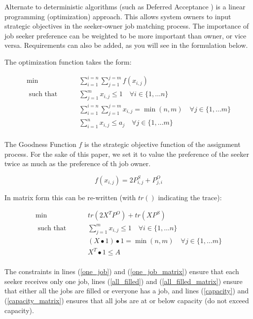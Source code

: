 Alternate to deterministic algorithms (such as Deferred Acceptance \cite{1962_Gale}) is a linear programming (optimization) approach. This allows system owners to input strategic objectives in the seeker-owner job matching process. The importance of job seeker preference can be weighted to be more important than owner, or vice versa. Requirements can also be added, as you will see in the formulation below.

The optimization function takes the form:

\begin{align}
\min \qquad & \sum_{i = 1}^{i=n} \sum_{j = 1}^{j=m} f(x_{i,j}) \\
\text{ such that } \qquad & \sum_{j=1}^m x_{i,j} \leq 1 \quad  \forall i \in \{1, \dots n\} \label{one_job}\\
& \sum_{i = 1}^{i=n} \sum_{j = 1}^{j=m}x_{i,j} = \min(n,m) \quad  \forall j \in \{1, \dots m\}  \label{all_filled}\\
& \sum_{i=1}^n x_{i,j} \leq a_j \quad  \forall j \in \{1, \dots m\} \label{capacity} \\
\end{align}

The Goodness Function $f$ is the strategic objective function of the assignment process. For the sake of this paper, we set it to value the preference of the seeker twice as much as the preference of th job owner.

\[f(x_{i,j}) = 2P^S_{i,j} + P^O_{j,i}\]

In matrix form this can be re-written (with $tr()$ indicating the trace):

\begin{align}
\min \qquad & tr(2X^TP^O) + tr(XP^S) \\
\text{ such that } \qquad & \sum_{j=1}^m x_{i,j} \leq 1 \quad  \forall i \in \{1, \dots n\}  \label{one_job_matrix}\\
& (X \bullet 1)\bullet 1 = \min(n,m) \quad  \forall j \in \{1, \dots m\} \label{all_filled_matrix}\\
& X^T \bullet 1 \leq A \label{capacity_matrix} \\
\end{align}

The constraints in lines (\ref{one_job}) and (\ref{one_job_matrix}) ensure that each seeker receives only one job, lines (\ref{all_filled}) and (\ref{all_filled_matrix}) ensure that either all the jobs are filled or everyone has a job, and lines (\ref{capacity}) and (\ref{capacity_matrix}) ensures that all jobs are at or below capacity (do not exceed capacity).